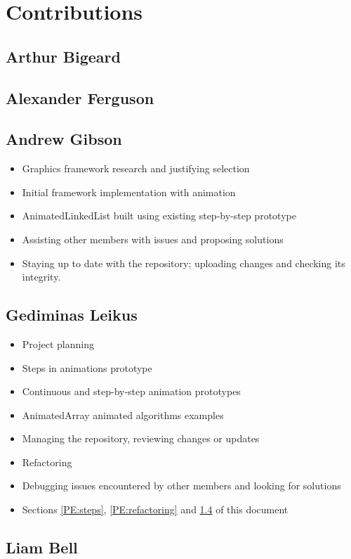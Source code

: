 \documentclass{l3proj}
\begin{document}
\section{Contributions}
\subsection{Arthur Bigeard}
\subsection{Alexander Ferguson}
\subsection{Andrew Gibson}
\begin{itemize}
	\item Graphics framework research and justifying selection
	\item Initial framework implementation with animation
	\item AnimatedLinkedList built using existing step-by-step prototype
	\item Assisting other members with issues and proposing solutions
	\item Staying up to date with the repository; uploading changes
and checking its integrity.
\end{itemize}
\subsection{Gediminas Leikus}
\label{Gediminas:Con}
\begin{itemize}
	\item Project planning
	\item Steps in animations prototype
	\item Continuous and step-by-step animation prototypes
	\item AnimatedArray animated algorithms examples
	\item Managing the repository, reviewing changes or updates
	\item Refactoring
	\item Debugging issues encountered by other members and looking for solutions
	\item Sections \ref{PE:steps}, \ref{PE:refactoring} and \ref{Gediminas:Con} of this document
\end{itemize}
\subsection{Liam Bell}



\end{document}
